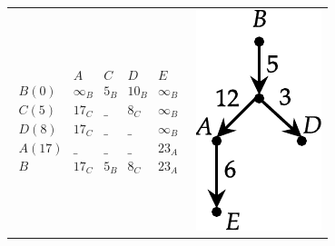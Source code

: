 \begin{Example}
\begin{center}
\begin{tabular}{cc}
	\begin{minipage}{5cm}
	$\begin{array}{r|cccc}
	 	 &		A	&	C	&	D	&	E\\
	\hline
	B(0) &	\infty_B	&	\boxed{5_B}	&	10_B	&	\infty_B\\
	C(5) &	17_C	&	\_	&	\boxed{8_C}	&	\infty_B\\
	D(8) &	\boxed{17_C}	&	\_	&	\_	&	\infty_B\\
	A(17)&	\_	&	\_	&	\_	&	23_A\\
	\hline
	B	&	17_C	&	5_B	&	8_C	&	23_A
	\end{array}$
	\end{minipage}
&
	\begin{minipage}{5cm}
		\centering
	\includegraphics[scale=0.7]{Images/ShortestPaths.pdf}
	\end{minipage}

\end{tabular}
\end{center}

\end{Example}


%
